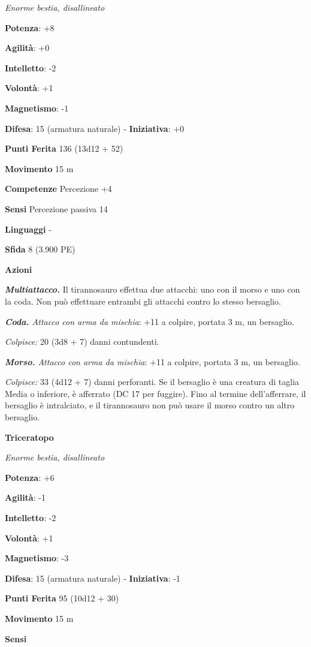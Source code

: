 \begin{multicols}{2}
\emph{Enorme bestia, disallineato}

\textbf{Potenza}: +8

\textbf{Agilità}: +0

\textbf{Intelletto}: -2

\textbf{Volontà}: +1

\textbf{Magnetismo}: -1

\textbf{Difesa}: 15 (armatura naturale) - \textbf{Iniziativa}: +0

\textbf{Punti Ferita} 136 (13d12 + 52)

\textbf{Movimento} 15 m

\textbf{Competenze} Percezione +4

\textbf{Sensi} Percezione passiva 14

\textbf{Linguaggi} -

\textbf{Sfida} 8 (3.900 PE)\smallskip

\smallskip\textbf{Azioni}

\emph{\textbf{Multiattacco.}} Il tirannosauro effettua due attacchi: uno
con il morso e uno con la coda. Non può effettuare entrambi gli attacchi
contro lo stesso bersaglio.

\emph{\textbf{Coda.} Attacco con arma da mischia}: +11 a colpire,
portata 3 m, un bersaglio.

\emph{Colpisce:} 20 (3d8 + 7) danni contundenti.

\emph{\textbf{Morso.} Attacco con arma da mischia}: +11 a colpire,
portata 3 m, un bersaglio.

\emph{Colpisce:} 33 (4d12 + 7) danni perforanti. Se il bersaglio è una
creatura di taglia Media o inferiore, è afferrato (DC 17 per fuggire).
Fino al termine dell'afferrare, il bersaglio è intralciato, e il
tirannosauro non può usare il morso contro un altro bersaglio.

\textbf{Triceratopo}

\emph{Enorme bestia, disallineato}

\textbf{Potenza}: +6

\textbf{Agilità}: -1

\textbf{Intelletto}: -2

\textbf{Volontà}: +1

\textbf{Magnetismo}: -3

\textbf{Difesa}: 15 (armatura naturale) - \textbf{Iniziativa}: -1

\textbf{Punti Ferita} 95 (10d12 + 30)

\textbf{Movimento} 15 m

\textbf{Sensi} 


\end{multicols}
